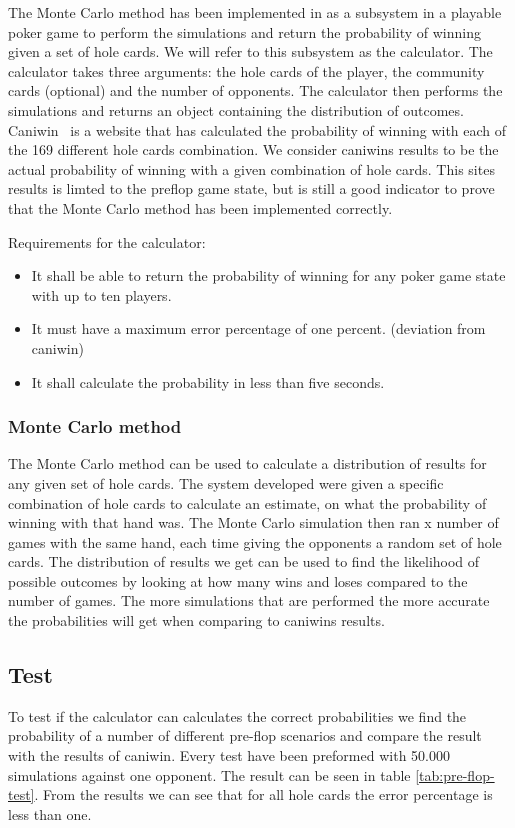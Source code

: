 The Monte Carlo method has been implemented in as a subsystem in a playable poker game to perform the simulations and return the probability of winning given a set of hole cards. We will refer to this subsystem as the calculator. The calculator takes three arguments: the hole cards of the player, the community cards (optional) and the number of opponents. The calculator then performs the simulations and returns an object containing the distribution of outcomes.
Caniwin~\cite{caniwin} is a website that has calculated the probability of winning with each of the 169 different hole cards combination. We consider caniwins results to be the actual probability of winning with a given combination of hole cards. This sites results is limted to the preflop game state, but is still a good indicator to prove that the Monte Carlo method has been implemented correctly.

Requirements for the calculator:
\begin{itemize}
\item It shall be able to return the probability of winning for any poker game state with up to ten players.
\item It must have a maximum error percentage of one percent. (deviation from caniwin)
\item It shall calculate the probability in less than five seconds.
\end{itemize}


\subsubsection{Monte Carlo method}
The Monte Carlo method can be used to calculate a distribution of results for any given set of hole cards. The system developed were given a specific combination of hole cards to calculate an estimate, on what the probability of winning with that hand was. The Monte Carlo simulation then ran x number of games with the same hand, each time giving the opponents a random set of hole cards. The distribution of results we get can be used to find the likelihood of possible outcomes by looking at how many wins and loses compared to the number of games. The more simulations that are performed the more accurate the probabilities will get when comparing to caniwins results.

\subsection{Test}
To test if the calculator can calculates the correct probabilities we find the probability of a number of different pre-flop scenarios and compare the result with the results of caniwin. Every test have been preformed with 50.000 simulations against one opponent. The result can be seen in table \ref{tab:pre-flop-test}. From the results we can see that for all hole cards the error percentage is less than one.

